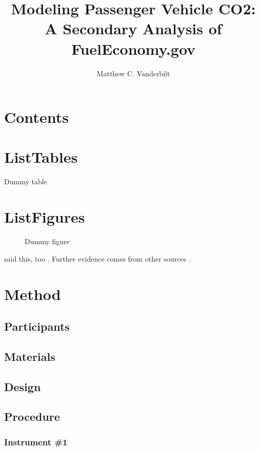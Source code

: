 \documentclass[man]{apa7}
\title{Modeling Passenger Vehicle CO2: A Secondary Analysis of FuelEconomy.gov}
\author{Matthew C. Vanderbilt}
\affiliation{University of San Diego}
\begin{document}
\maketitle

\section{Contents}
\tableofcontents
\newpage

\section{ListTables}
\begin{table}
    \caption{Dummy table}
\end{table}

\section{ListFigures}
\begin{figure}
  \caption{Dummy figure}
\end{figure}




\Textcite{GreeneDavidL2016} said this,
too \parencite{GreeneDavidL2017}.  Further evidence comes from
other sources \parencite{WaliBehram2019Fegw,GreeneDavidL2017}.

\section{Method}
\subsection{Participants}
\lipsum[4]

\subsection{Materials}
\lipsum[5]

\subsection{Design}
\lipsum[6]

\subsection{Procedure}
\lipsum[7]

\subsubsection{Instrument \#1}
\lipsum[8]
\end{document}
